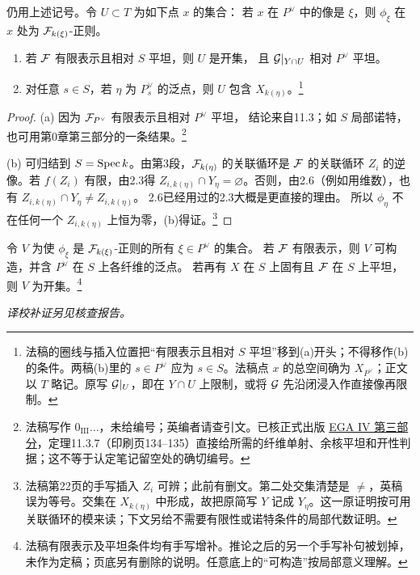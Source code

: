 仍用上述记号。令 $U\subset T$ 为如下点 $x$ 的集合：
若 $x$ 在 $P^\vee$ 中的像是 $\xi$，则 $\phi_\xi$ 在 $x$ 处为 $\mathcal F_{k(\xi)}$-正则。
\begin{enumerate}
\item[(a)] 若 $\mathcal F$ 有限表示且相对 $S$ 平坦，则 $U$ 是开集，
且 $\mathcal G|_{Y\cap U}$ 相对 $P^\vee$ 平坦。
\item[(b)] 对任意 $s\in S$，若 $\eta$ 为 $P^\vee_s$ 的泛点，则 $U$ 包含 $X_{k(\eta)}$。\footnote{法稿的圈线与插入位置把“有限表示且相对 $S$ 平坦”移到(a)开头；不得移作(b)的条件。两稿(b)里的 $s\in P^\vee$ 应为 $s\in S$。法稿点 $x$ 的总空间确为 $X_{P^\vee}$；正文以 $T$ 略记。原写 $\mathcal G|_U$，即在 $Y\cap U$ 上限制，或将 $\mathcal G$ 先沿闭浸入作直接像再限制。}
\end{enumerate}
\begin{proof}
(a) 因为 $\mathcal F_{P^\vee}$ 有限表示且相对 $P^\vee$ 平坦，
结论来自11.3；如 $S$ 局部诺特，也可用第0章第三部分的一条结果。\footnote{法稿写作 $0_{\mathrm{III}}\ldots$，未给编号；英编者请查引文。已核正式出版 \href{https://webusers.imj-prg.fr/~leila.schneps/grothendieckcircle/EGA/EGAIV.3.pdf}{EGA IV 第三部分}，定理11.3.7（印刷页134--135）直接给所需的纤维单射、余核平坦和开性判据；这不等于认定笔记留空处的确切编号。}

(b) 可归结到 $S=\operatorname{Spec} k$。由第3段，$\mathcal F_{k(\eta)}$ 的关联循环是
$\mathcal F$ 的关联循环 $Z_i$ 的逆像。若 $f(Z_i)$ 有限，由2.3得
$Z_{i,k(\eta)}\cap Y_\eta=\varnothing$。否则，由2.6（例如用维数），也有
$Z_{i,k(\eta)}\cap Y_\eta\ne Z_{i,k(\eta)}$。
2.6已经用过的2.3大概是更直接的理由。
所以 $\phi_\eta$ 不在任何一个 $Z_{i,k(\eta)}$ 上恒为零，(b)得证。\footnote{法稿第22页的手写插入 $Z_i$ 可辨；此前有删文。第二处交集清楚是 $\ne$，英稿误为等号。交集在 $X_{k(\eta)}$ 中形成，故把原简写 $Y$ 记成 $Y_\eta$。这一原证明按可用关联循环的模来读；下文另给不需要有限性或诺特条件的局部代数证明。}
\end{proof}

令 $V$ 为使 $\phi_\xi$ 是 $\mathcal F_{k(\xi)}$-正则的所有 $\xi\in P^\vee$ 的集合。
若 $\mathcal F$ 有限表示，则 $V$ 可构造，并含 $P^\vee$ 在 $S$ 上各纤维的泛点。
若再有 $X$ 在 $S$ 上固有且 $\mathcal F$ 在 $S$ 上平坦，则 $V$ 为开集。\footnote{法稿有限表示及平坦条件均有手写增补。推论之后的另一个手写补句被划掉，未作为定稿；页底另有删除的说明。任意底上的“可构造”按局部意义理解。}

\par\noindent\textit{译校补证另见核查报告。}

\endgroup
